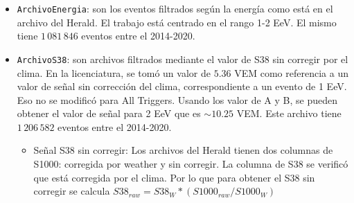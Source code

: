 \begin{itemize}
    \item \verb|ArchivoEnergia|: son los eventos filtrados según la energía como está en el archivo del Herald. El trabajo está centrado en el rango 1-2 EeV. El mismo  tiene $1\,081\,846$ eventos entre el 2014-2020. 
    
    \item \verb|ArchivoS38|: son archivos filtrados mediante el valor de S38 sin corregir por el clima. En la licenciatura, se tomó un valor de $5.36$ VEM como referencia a un valor de señal sin corrección del clima,  correspondiente a un evento de 1 EeV. Eso no se modificó para All Triggers. Usando los valor de A y B, se pueden obtener el valor de señal para 2 EeV que es $\sim 10.25$ VEM. Este archivo  tiene $1\,206\,582$ eventos entre el 2014-2020.
    
    \begin{itemize}
        \item Señal S38 sin corregir: Los archivos del Herald tienen dos columnas de S1000: corregida por weather y sin corregir. La columna de S38 se verificó que está corregida por el clima. Por lo que para obtener el S38 sin corregir se calcula $S38_{raw} =S38_W *(S1000_{raw}/S1000_W) $
    \end{itemize}
\end{itemize}






